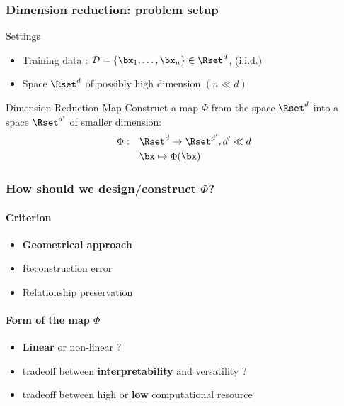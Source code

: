 \begin{frame}
  \frametitle{Dimension reduction: problem setup}

    \begin{block}{Settings}
      \begin{itemize}
        \item \alert{Training data } : $\mathcal{D}=\{\bx_1,\ldots,\bx_n\} \in \Rset^d$,   (i.i.d.)
        \item Space $\Rset^d$ of possibly high dimension $(n \ll d)$
      \end{itemize}
    \end{block}

    \vfill
    
    \begin{block}{Dimension Reduction Map}
       Construct a map $\Phi$ from the space $\Rset^{d}$ into a space $\Rset^{d'}$ of \alert{smaller dimension}:
      \begin{align*}
          \Phi:\quad & \Rset^d \to \Rset^{d'}, d' \ll d\\
                     & \bx \mapsto \Phi(\bx)
      \end{align*}
    \end{block}
    
\end{frame}
 
\begin{frame}
  \frametitle{How should we design/construct $\Phi$?}

  \paragraph{Criterion}
  \begin{itemize}
    \item \alert{\bf Geometrical approach}
    \item Reconstruction error
    \item Relationship preservation
  \end{itemize}

  \vfill
  
  \paragraph{Form of the map $\Phi$}
  \begin{itemize}
    \item \alert{\bf Linear} or non-linear ?
    \item tradeoff between \alert{\bf interpretability} and versatility ?
    \item tradeoff between high or \alert{\bf low} computational resource
  \end{itemize}

\end{frame}
